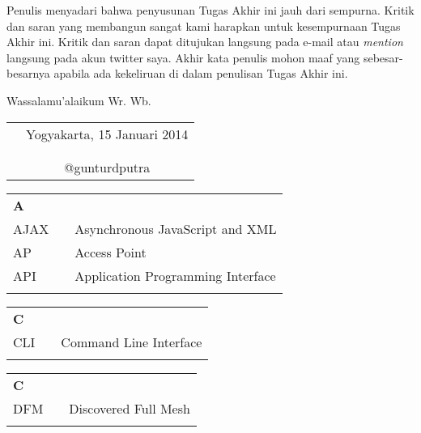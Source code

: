 \documentclass{jtetiskripsi}
\begin{document}
Penulis menyadari bahwa penyusunan Tugas Akhir ini jauh dari sempurna. Kritik dan saran yang membangun sangat kami harapkan untuk kesempurnaan Tugas Akhir ini. Kritik dan saran dapat ditujukan langsung pada e-mail atau \emph{mention} langsung pada akun twitter saya. Akhir kata penulis mohon maaf yang sebesar-besarnya apabila ada kekeliruan di dalam penulisan Tugas Akhir ini.

\vspace{0.5cm}

Wassalamu'alaikum Wr. Wb.

\begin{tabular}{p{7.5cm}c}
&Yogyakarta, 15 Januari 2014\\
&\\
&\\
&@gunturdputra
\end{tabular}

\tableofcontents
{}
\listoftables
{}
\listoffigures
{}

\singkatan
\noindent

\begin{tabular}{p{20pt}p{3pt}l}
\textbf{A}\\
AJAX & & Asynchronous JavaScript and XML\\
AP & & Access Point\\
API & & Application Programming Interface\\
\\
\end{tabular}

\begin{tabular}{p{20pt}p{3pt}l}
\textbf{C}\\
CLI & & Command Line Interface\\
\\
\end{tabular}

\begin{tabular}{p{20pt}p{3pt}l}
\textbf{C}\\
DFM & & Discovered Full Mesh\\
\\
\end{tabular}
\end{document}
